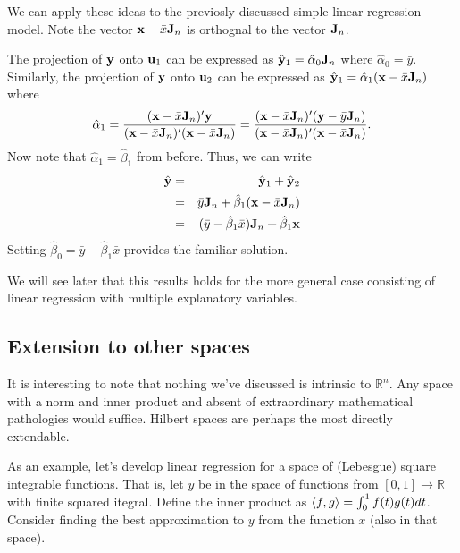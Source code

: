 We can apply these ideas to the previosly discussed simple linear regression model.
Note the vector $\mathbf{x} - {\bar x} \mathbf{J}_n$ is orthognal to the vector $\mathbf{J}_n$. 

The projection of $\mathbf{y}$ onto ${\bf u}_1$ can be expressed as  $\hat {\mathbf{y}}_1 = {\hat \alpha_0} \mathbf{J}_n$ where ${\hat \alpha_0} = {\bar y}$. Similarly, the projection of $\mathbf{y}$ onto ${\bf u}_2$ can be expressed as  $\hat {\mathbf{y}}_1 =  {\hat \alpha_1} (\mathbf{x} - {\bar x}\mathbf{J}_n)$ where 
$$
{\hat \alpha_1} = \frac{(\mathbf{x}- \bar x \mathbf{J}_n)' \mathbf{y}}{(\mathbf{x}- \bar x \mathbf{J}_n)'(\mathbf{x}- \bar x \mathbf{J}_n)} = \frac{(\mathbf{x}- \bar x \mathbf{J}_n)' (\mathbf{y} - \bar y \mathbf{J}_n)}{(\mathbf{x}- \bar x \mathbf{J}_n)'(\mathbf{x}- \bar x \mathbf{J}_n)}.
$$
Now note that ${\hat \alpha_1} = {\hat \beta_1}$ from before.
Thus, we can write 
\begin{eqnarray}
{\hat {\mathbf{y}}} &=& {\hat {\mathbf{y}}}_1 + {\hat {\mathbf{y}}}_2 \nonumber \\
&=& {\bar y}  \mathbf{J}_n + {\hat \beta_1} (\mathbf{x} - {\bar x}\mathbf{J}_n) \nonumber\\
&=& ({\bar y}  - {\hat \beta_1} {\bar x}) \mathbf{J}_n + {\hat \beta_1} \mathbf{x}  \nonumber
\end{eqnarray}
Setting ${\hat \beta_0} = {\bar y}  - {\hat \beta_1} {\bar x}$ provides the familiar solution.


We will see later that this results holds for the more general case consisting of linear regression with multiple explanatory variables.


\subsection{Extension to other spaces}

It is interesting to note that nothing we've discussed is intrinsic
to $\mathbb{R}^n$. Any space with a norm and inner product and
absent of extraordinary mathematical pathologies would suffice.  Hilbert spaces are perhaps the most directly extendable. 

As an example, let's develop linear regression for
a space of (Lebesgue) square integrable functions. That is, let $y$ be in the space
of functions from $[0,1] \rightarrow \mathbb{R}$ with finite squared itegral.
Define the inner product as $\langle f, g \rangle = \int_0^1 f(t)g(t)dt$. Consider
finding the best approximation to $y$ from the function $x$ (also in that space). 

